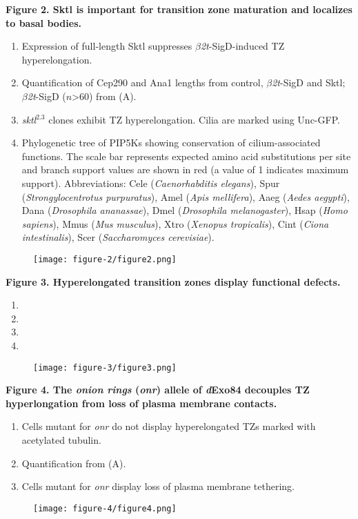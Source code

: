 \documentclass[12pt, twoside, letterpaper]{article}
\newcommand{\sigd}{$\beta$\textit{2t}-SigD}
\begin{document}
\textbf{Figure 2. Sktl is important for transition zone maturation and localizes to basal bodies.}
\begin{enumerate}[label={\Alph*.}, nolistsep]
\item Expression of full-length Sktl suppresses \sigd{}-induced TZ hyperelongation.
\item Quantification of Cep290 and Ana1 lengths from control, \sigd{} and Sktl; \sigd{} ($n$\textgreater 60) from (A).
\item \textit{sktl}$^{2.3}$ clones exhibit TZ hyperelongation. Cilia are marked using
  Unc-GFP.
\item Phylogenetic tree of PIP5Ks showing conservation of cilium-associated functions.
  The scale bar represents expected amino acid substitutions per site and branch support values are shown in red (a value of 1 indicates maximum support).
Abbreviations: Cele (\textit{Caenorhabditis elegans}), Spur (\textit{Strongylocentrotus purpuratus}), Amel (\textit{Apis mellifera}), Aaeg (\textit{Aedes aegypti}), Dana (\textit{Drosophila ananassae}), Dmel (\textit{Drosophila melanogaster}), Hsap (\textit{Homo sapiens}), Mmus (\textit{Mus musculus}), Xtro (\textit{Xenopus tropicalis}), Cint (\textit{Ciona intestinalis}), Scer (\textit{Saccharomyces cerevisiae}).
\end{enumerate}

\begin{figure}[ht]
  \texttt{[image: figure-2/figure2.png]}
\end{figure}
\newpage


%
\textbf{Figure 3. Hyperelongated transition zones display functional defects.}
\begin{enumerate}[label={(\Alph*)}, nolistsep]
\item
\item
\item
\item
\end{enumerate}

\begin{figure}[ht]
  \texttt{[image: figure-3/figure3.png]}
\end{figure}
\newpage


\textbf{Figure 4. The \textit{onion rings} (\textit{onr}) allele of \textit{d}Exo84 decouples TZ hyperlongation from loss of plasma membrane contacts.}
\begin{enumerate}[label={(\Alph*)}, nolistsep]
\item Cells mutant for \textit{onr} do not display hyperelongated TZs marked with acetylated tubulin.
\item Quantification from (A).
\item Cells mutant for \textit{onr} display loss of plasma membrane tethering.
\end{enumerate}

\begin{figure}[ht]
  \texttt{[image: figure-4/figure4.png]}
\end{figure}
\newpage
\end{document}
